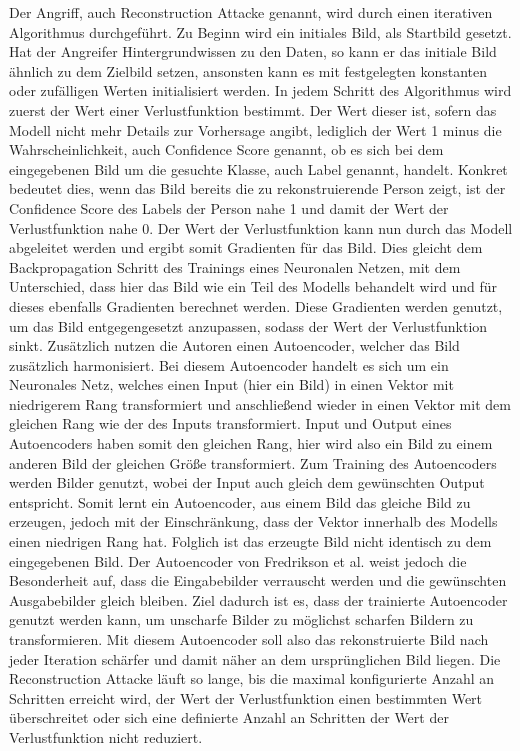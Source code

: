 Der Angriff, auch Reconstruction Attacke genannt, wird durch einen iterativen Algorithmus durchgeführt.
Zu Beginn wird ein initiales Bild, als Startbild gesetzt. 
Hat der Angreifer Hintergrundwissen zu den Daten, so kann er das initiale Bild ähnlich zu dem Zielbild setzen, ansonsten kann es mit festgelegten konstanten oder zufälligen Werten initialisiert werden. 
In jedem Schritt des Algorithmus wird zuerst der Wert einer Verlustfunktion bestimmt.
Der Wert dieser ist, sofern das Modell nicht mehr Details zur Vorhersage angibt, lediglich der Wert 1 minus die Wahrscheinlichkeit, auch Confidence Score genannt, ob es sich bei dem eingegebenen Bild um die gesuchte Klasse, auch Label genannt, handelt.
Konkret bedeutet dies, wenn das Bild bereits die zu rekonstruierende Person zeigt, ist der Confidence Score des Labels der Person nahe 1 und damit der Wert der Verlustfunktion nahe 0.
Der Wert der Verlustfunktion kann nun durch das Modell abgeleitet werden und ergibt somit Gradienten für das Bild.
Dies gleicht dem Backpropagation Schritt des Trainings eines Neuronalen Netzen, mit dem Unterschied, dass hier das Bild wie ein Teil des Modells behandelt wird und für dieses ebenfalls Gradienten berechnet werden.
Diese Gradienten werden genutzt, um das Bild entgegengesetzt anzupassen, sodass der Wert der Verlustfunktion sinkt.
Zusätzlich nutzen die Autoren einen Autoencoder, welcher das Bild zusätzlich harmonisiert.
Bei diesem Autoencoder handelt es sich um ein Neuronales Netz, welches einen Input (hier ein Bild) in einen Vektor mit niedrigerem Rang transformiert und anschließend wieder in einen Vektor mit dem gleichen Rang wie der des Inputs transformiert.
Input und Output eines Autoencoders haben somit den gleichen Rang, hier wird also ein Bild zu einem anderen Bild der gleichen Größe transformiert.
Zum Training des Autoencoders werden Bilder genutzt, wobei der Input auch gleich dem gewünschten Output entspricht. 
Somit lernt ein Autoencoder, aus einem Bild das gleiche Bild zu erzeugen, jedoch mit der Einschränkung, dass der Vektor innerhalb des Modells einen niedrigen Rang hat.
Folglich ist das erzeugte Bild nicht identisch zu dem eingegebenen Bild.
Der Autoencoder von Fredrikson et al. \cite{P-3} weist jedoch die Besonderheit auf, dass die Eingabebilder verrauscht werden und die gewünschten Ausgabebilder gleich bleiben.
Ziel dadurch ist es, dass der trainierte Autoencoder genutzt werden kann, um unscharfe Bilder zu möglichst scharfen Bildern zu transformieren.
Mit diesem Autoencoder soll also das rekonstruierte Bild nach jeder Iteration schärfer und damit näher an dem ursprünglichen Bild liegen.
Die Reconstruction Attacke läuft so lange, bis die maximal konfigurierte Anzahl an Schritten erreicht wird, der Wert der Verlustfunktion einen bestimmten Wert überschreitet oder sich eine definierte Anzahl an Schritten der Wert der Verlustfunktion nicht reduziert.


